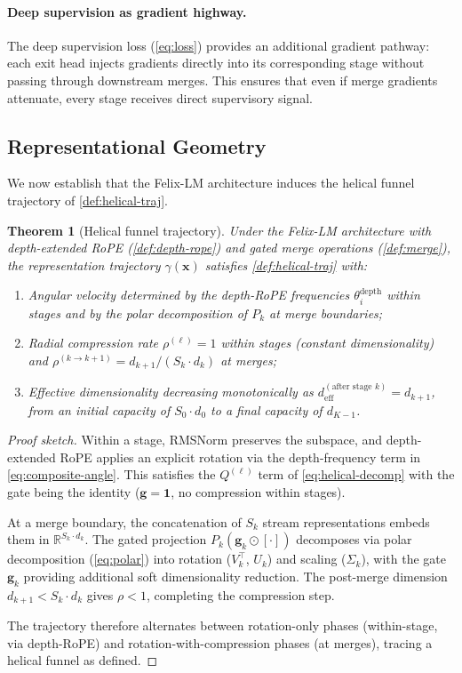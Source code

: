 \documentclass[11pt,a4paper]{article}
\theoremstyle{definition}
\theoremstyle{plain}
\newtheorem{theorem}[definition]{Theorem}
\theoremstyle{remark}
\newcommand{\R}{\mathbb{R}}
\begin{document}
\paragraph{Deep supervision as gradient highway.}
The deep supervision loss (\cref{eq:loss}) provides an additional gradient 
pathway: each exit head injects gradients directly into its corresponding 
stage without passing through downstream merges. This ensures that even if 
merge gradients attenuate, every stage receives direct supervisory signal.

\subsection{Representational Geometry}\label{sec:rep-geom}

We now establish that the Felix-LM architecture induces the helical funnel 
trajectory of \cref{def:helical-traj}.

\begin{theorem}[Helical funnel trajectory]\label{thm:helical}
Under the Felix-LM architecture with depth-extended RoPE 
(\cref{def:depth-rope}) and gated merge operations 
(\cref{def:merge}), the representation trajectory 
$\gamma(\mathbf{x})$ satisfies \cref{def:helical-traj} 
with:
\begin{enumerate}[label=(\alph*)]
  \item Angular velocity determined by the depth-RoPE frequencies 
    $\theta_i^{\text{depth}}$ within stages and by the polar decomposition 
    of $P_k$ at merge boundaries;
  \item Radial compression rate $\rho^{(\ell)} = 1$ within stages 
    (constant dimensionality) and $\rho^{(k \to k+1)} = d_{k+1} / 
    (S_k \cdot d_k)$ at merges;
  \item Effective dimensionality decreasing monotonically as 
    $d_{\text{eff}}^{(\text{after stage } k)} = d_{k+1}$, from an initial 
    capacity of $S_0 \cdot d_0$ to a final capacity of $d_{K-1}$.
\end{enumerate}
\end{theorem}
\begin{proof}[Proof sketch]
Within a stage, RMSNorm preserves the subspace, and depth-extended RoPE 
applies an explicit rotation via the depth-frequency term in 
\cref{eq:composite-angle}. This satisfies the 
$Q^{(\ell)}$ term of \cref{eq:helical-decomp} with the gate 
being the identity ($\mathbf{g} = \mathbf{1}$, no compression within 
stages).

At a merge boundary, the concatenation of $S_k$ stream representations 
embeds them in $\R^{S_k \cdot d_k}$. The gated projection 
$P_k(\mathbf{g}_k \odot [\cdot])$ decomposes via polar decomposition 
(\cref{eq:polar}) into rotation ($V_k^\top$, $U_k$) and 
scaling ($\Sigma_k$), with the gate $\mathbf{g}_k$ providing additional 
soft dimensionality reduction. The post-merge dimension $d_{k+1} < S_k 
\cdot d_k$ gives $\rho < 1$, completing the compression step.

The trajectory therefore alternates between rotation-only phases 
(within-stage, via depth-RoPE) and rotation-with-compression phases 
(at merges), tracing a helical funnel as defined.
\end{proof}
\end{document}
